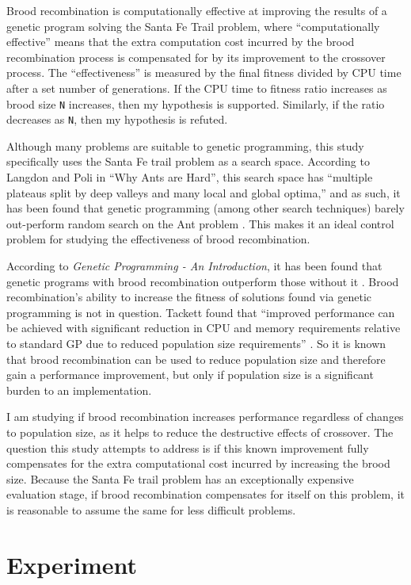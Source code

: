 \documentclass{acm_proc_article-sp}
\begin{document}
Brood recombination is computationally effective at improving the
results of a genetic program solving the Santa Fe Trail problem, where
``computationally effective'' means that the extra computation cost
incurred by the brood recombination process is compensated for by its
improvement to the crossover process. The ``effectiveness'' is
measured by the final fitness divided by CPU time after a set number
of generations. If the CPU time to fitness ratio increases as brood
size \texttt{N} increases, then my hypothesis is supported. Similarly,
if the ratio decreases as \texttt{N}, then my hypothesis is refuted.

Although many problems are suitable to genetic programming, this study
specifically uses the Santa Fe trail problem as a search
space. According to Langdon and Poli in ``Why Ants are Hard'', this
search space has ``multiple plateaus split by deep valleys and many
local and global optima,'' and as such, it has been found that genetic
programming (among other search techniques) barely out-perform random
search on the Ant problem \cite{Langdon:Hard}. This makes it an ideal
control problem for studying the effectiveness of brood
recombination.

According to \emph{Genetic Programming - An Introduction}, it has been
found that genetic programs with brood recombination outperform those
without it \cite{Banzhaf:Intro}. Brood recombination's ability to
increase the fitness of solutions found via genetic programming is not
in question. Tackett found that ``improved performance can be achieved
with significant reduction in CPU and memory requirements relative to
standard GP due to reduced population size requirements''
\cite{Tackett:Brood}. So it is known that brood recombination can be
used to reduce population size and therefore gain a performance
improvement, but only if population size is a significant burden to an
implementation.

I am studying if brood recombination increases performance regardless
of changes to population size, as it helps to reduce the destructive
effects of crossover. The question this study attempts to address is
if this known improvement fully compensates for the extra
computational cost incurred by increasing the brood size. Because the
Santa Fe trail problem has an exceptionally expensive evaluation
stage, if brood recombination compensates for itself on this problem,
it is reasonable to assume the same for less difficult problems.

\section{Experiment}
\end{document}
